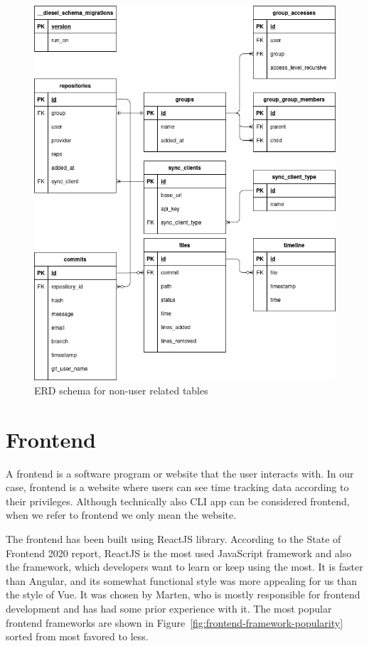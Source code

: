\begin{figure}[H]
    \includegraphics[width=\textwidth]{figures/erd_schema_general}
    \caption{ERD schema for non-user related tables}
    \label{fig:erd-schema-general}
\end{figure}

\section{Frontend}\label{sec:frontend}
A frontend is a software program or website that the user interacts with.
In our case, frontend is a website where users can see time tracking data according to their privileges.
Although technically also CLI app can be considered frontend, when we refer to frontend we only mean the website.

The frontend has been built using ReactJS library.
According to the State of Frontend 2020 report, ReactJS is the most used JavaScript framework and also the framework, which developers want to learn or keep using the most.
It is faster than Angular, and its somewhat functional style was more appealing for us than the style of Vue.
It was chosen by Marten, who is mostly responsible for frontend development and has had some prior experience with it.
The most popular frontend frameworks are shown in Figure~\ref{fig:frontend-framework-popularity} sorted from most favored to less.

